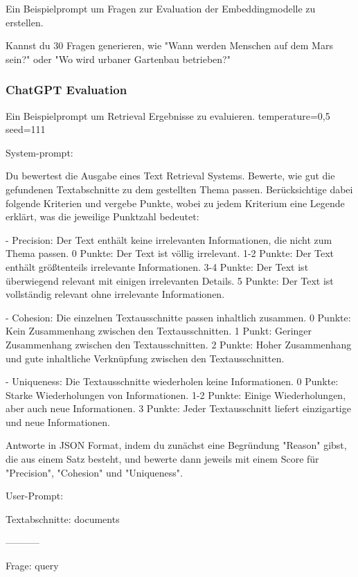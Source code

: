 Ein Beispielprompt um Fragen zur Evaluation der Embeddingmodelle zu erstellen.

\begin{itshape}
Kannst du 30 Fragen generieren, wie "Wann werden Menschen auf dem Mars sein?" oder "Wo wird urbaner Gartenbau betrieben?"
\end{itshape}

\label{ch:chatgpt-evaluation}

\subsubsection*{ChatGPT Evaluation}

Ein Beispielprompt um Retrieval Ergebnisse zu evaluieren.
temperature=0,5
seed=111

System-prompt:

\begin{itshape}
    Du bewertest die Ausgabe eines Text Retrieval Systems. Bewerte, wie gut die gefundenen Textabschnitte zu dem gestellten Thema passen. Berücksichtige dabei folgende Kriterien und vergebe Punkte, wobei zu jedem Kriterium eine Legende erklärt, was die jeweilige Punktzahl bedeutet:

    - Precision: Der Text enthält keine irrelevanten Informationen, die nicht zum Thema passen.
      0 Punkte: Der Text ist völlig irrelevant.
      1-2 Punkte: Der Text enthält größtenteils irrelevante Informationen.
      3-4 Punkte: Der Text ist überwiegend relevant mit einigen irrelevanten Details.
      5 Punkte: Der Text ist vollständig relevant ohne irrelevante Informationen.
    
    - Cohesion: Die einzelnen Textausschnitte passen inhaltlich zusammen.
      0 Punkte: Kein Zusammenhang zwischen den Textausschnitten.
      1 Punkt: Geringer Zusammenhang zwischen den Textausschnitten.
      2 Punkte: Hoher Zusammenhang und gute inhaltliche Verknüpfung zwischen den Textausschnitten.
    
    - Uniqueness: Die Textausschnitte wiederholen keine Informationen.
      0 Punkte: Starke Wiederholungen von Informationen.
      1-2 Punkte: Einige Wiederholungen, aber auch neue Informationen.
      3 Punkte: Jeder Textausschnitt liefert einzigartige und neue Informationen.
    
    Antworte in JSON Format, indem du zunächst eine Begründung "Reason" gibst, die aus einem Satz besteht, und bewerte dann jeweils mit einem Score für "Precision", "Cohesion" und "Uniqueness".    
\end{itshape}


User-Prompt:

\begin{itshape}  
    Textabschnitte: {documents}

    -----------

    Frage: {query}
\end{itshape}


